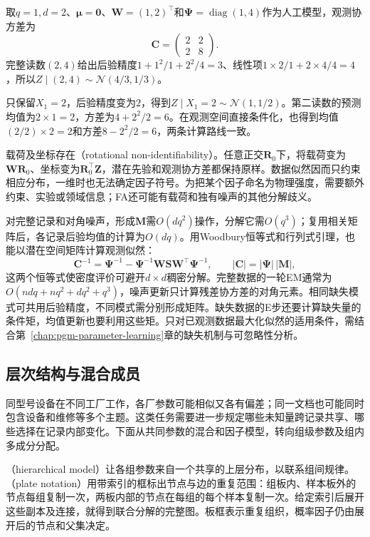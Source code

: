 \begin{example}[两台传感器对一个连续因子的测量]
  \label{ex:pgm-static-directed-fa-missing}
  取$q=1,d=2$、$\bm\mu=\bm{0}$、$\bm W=(1,2)^\top$和$\bm\Psi=\operatorname{diag}(1,4)$作为人工模型，观测协方差为
  \[
    \bm{C}=\begin{pmatrix}2&2\\2&8\end{pmatrix}.
  \]
  完整读数$(2,4)$给出后验精度$1+1^2/1+2^2/4=3$、线性项$1\times2/1+2\times4/4=4$，所以$Z\mid(2,4)\sim\mathcal N(4/3,1/3)$。

  只保留$X_1=2$，后验精度变为$2$，得到$Z\mid X_1=2\sim\mathcal N(1,1/2)$。第二读数的预测均值为$2\times1=2$，方差为$4+2^2/2=6$。在观测空间直接条件化，也得到均值$(2/2)\times2=2$和方差$8-2^2/2=6$，两条计算路线一致。
\end{example}

载荷及坐标存在（rotational non-identifiability）。任意正交$\bm R_0$下，将载荷变为$\bm W\bm R_0$、坐标变为$\bm R_0^\top\bm Z$，潜在先验和观测协方差都保持原样。数据似然因而只约束相应分布，一维时也无法确定因子符号。为把某个因子命名为物理强度，需要额外约束、实验或领域信息；FA还可能有载荷和独有噪声的其他分解歧义。

对完整记录和对角噪声，形成$\bm M$需$O(dq^2)$操作，分解它需$O(q^3)$；复用相关矩阵后，各记录后验均值的计算为$O(dq)$。用Woodbury恒等式和行列式引理，也能以潜在空间矩阵计算观测似然：
\[
  \bm{C}^{-1}=\bm{\Psi}^{-1}
    -\bm{\Psi}^{-1}\bm{W}\bm{S}\bm{W}^{\top}\bm{\Psi}^{-1},
  \qquad |\bm{C}|=|\bm{\Psi}|\,|\bm{M}|,
\]
这两个恒等式使密度评价可避开$d\times d$稠密分解。完整数据的一轮EM通常为$O(ndq+nq^2+dq^2+q^3)$，噪声更新只计算残差协方差的对角元素。相同缺失模式可共用后验精度，不同模式需分别形成矩阵。缺失数据的E步还要计算缺失量的条件矩，均值更新也要利用这些矩。只对已观测数据最大化似然的适用条件，需结合第~\ref{chap:pgm-parameter-learning}章的缺失机制与可忽略性分析。

\subsection{层次结构与混合成员}
\label{sec:pgm-static-directed-hierarchy-membership}

同型号设备在不同工厂工作，各厂参数可能相似又各有偏差；同一文档也可能同时包含设备和维修等多个主题。这类任务需要进一步规定哪些未知量跨记录共享、哪些选择在记录内部变化。下面从共同参数的混合和因子模型，转向组级参数及组内多成分分配。

（hierarchical model）让各组参数来自一个共享的上层分布，以联系组间规律。（plate notation）用带索引的框标出节点与边的重复范围：组板内、样本板外的节点每组复制一次，两板内部的节点在每组的每个样本复制一次。给定索引后展开这些副本及连接，就得到联合分解的完整图。板框表示重复组织，概率因子仍由展开后的节点和父集决定。

